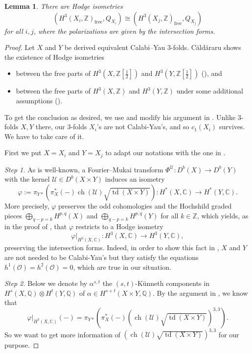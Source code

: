\documentclass[a4paper,11pt]{article}
\newtheorem{lem}[thm]{Lemma}
\theoremstyle{definition}\newtheorem{defn}[thm]{Definition}
\theoremstyle{remark}\newtheorem{remark}[thm]{Remark}
\numberwithin{equation}{section}
\newcommand{\td}{\ensuremath{\operatorname{td}}}
\newcommand{\ch}{\ensuremath{\operatorname{ch}}}
\newcommand{\mc}{\mathcal}
\newcommand{\fm}[1]{\ensuremath{\Phi^{#1}}}
\newcommand{\Z}{\mathbb Z}
\newcommand{\Q}{\mathbb Q}
\newcommand{\C}{\mathbb C}
\begin{document}

\begin{lem}\label{lem:hodge}
There are Hodge isometries
$$
(H^3(X_i,\Z)_{\text{free}},Q_{X_i})\cong (H^3(X_j,\Z)_{\text{free}},Q_{X_j})
$$
for all $i,j$,
where the polarizations are given by the intersection forms.
\end{lem}

\begin{proof} 
Let $X$ and $Y$ be derived equivalent Calabi--Yau $3$-folds.
C\u{a}ld\u{a}raru shows the existence of Hodge isometries 
 
\begin{itemize}
\item between the free parts of $H^3(X,\Z[\frac{1}{2}])$
and $H^3(Y,\Z[\frac{1}{2}])$ (\cite[Proposition 3.1]{Ca07}), 
and 
\item between the free parts of $H^3(X,\Z)$
and $H^3(Y,\Z)$ under some additional assumptions 
(\cite[Proposition 3.4.]{Ca07}).
\end{itemize}

To get the conclusion as desired, 
we use and modify his argument in \cite{Ca07}.
Unlike $3$-folds $X,Y$ there, 
our $3$-folds $X_i$'s are not Calabi-Yau's,
and so $c_1(X_i)$ survives.
We have to take care of it.

First we put $X=X_i$ and $Y=X_j$ to adapt our notations with 
the one in \cite{Ca07}.

\emph{Step 1.}
As is well-known, a Fourier--Mukai transform 
$\fm{\mc U}\colon D^b(X) \to D^b(Y)$ with the kernel $\mc U\in D^b(X\times Y)$
induces an isometry
$$
\varphi:=\pi_{Y*}(\pi_X^*(-)\ch(\mc U)\sqrt{\td (X\times Y)})
 \colon H^*(X,\C)\to H^*(Y,\C).
$$
More precisely, $\varphi$ preserves the odd cohomologies 
and the Hochshild graded pieces
$\bigoplus _{q-p=k}H^{p,q}(X)$ and $\bigoplus _{q-p=k}H^{p,q}(Y)$ for all $k\in \Z$, 
which yields, as in the proof of 
\cite[Proposition 3.1]{Ca07}, that $\varphi$ restricts to 
a Hodge isometry 
$$
\varphi|_{H^3(X,\C)}\colon H^3(X,\C)\to H^3(Y,\C),
$$
preserving the intersection forms.
Indeed, in order to show this fact in \cite[ibid.]{Ca07}, 
$X$ and $Y$ are not needed 
to be Calabi-Yau's but they satisfy the equations $h^1(\mc O)=h^2(\mc O)=0$, 
which are true in our situation.


\emph{Step 2.}
Below we denote by $\alpha^{s,t}$ 
the $(s,t)$-K\"unneth components in $H^s(X,\Q)\otimes H^t(Y,\Q)$ of 
$\alpha\in H^{s+t}(X\times Y,\Q)$. 
By the argument in \cite{Ca07},
we know that 
%
\begin{equation*}
\varphi|_{H^3(X,\C)}(-)
=\pi_{Y*}(\pi_X^*(-)(\ch (\mc U)\sqrt{\td (X\times Y)})^{3,3}).
\end{equation*}
%
So we want to get more information of  
$
(\ch (\mc U)\sqrt{\td (X\times Y)})^{3,3}
$ 
for our purpose.
%


\end{proof}
\end{document}
